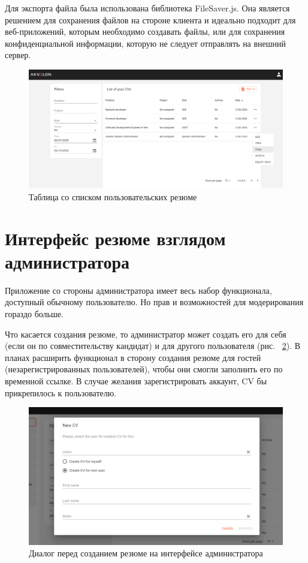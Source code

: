 \documentclass[a4paper,12pt]{diplom}
\begin{document}
Для экспорта файла была использована библиотека FileSaver.js. Она является решением для сохранения файлов на стороне клиента и идеально подходит для веб-приложений, которым необходимо создавать файлы, или для сохранения конфиденциальной информации, которую не следует отправлять на внешний сервер.


\begin{figure}[!ht]
\centering
\includegraphics[width=1\textwidth]{resources/cvlistuser.png}
\caption{Таблица со списком пользовательских резюме}
\label{14}
\end{figure}

\section{Интерфейс резюме взглядом администратора}

Приложение со стороны администратора имеет весь набор функционала, доступный обычному пользователю. Но прав и возможностей для модерирования гораздо больше.

Что касается создания резюме, то администратор может создать его для себя (если он по совместительству кандидат) и для другого пользователя (рис. ~\ref{15}). В планах расширить функционал в сторону создания резюме для гостей (незарегистрированных пользователей), чтобы
они смогли заполнить его по временной ссылке. В случае желания зарегистрировать аккаунт, CV бы прикрепилось к пользователю.

\begin{figure}[!ht]
\centering
\includegraphics[width=1\textwidth]{resources/newcvdialog.png}
\caption{Диалог перед созданием резюме на интерфейсе администратора}
\label{15}
\end{figure}
\end{document}
